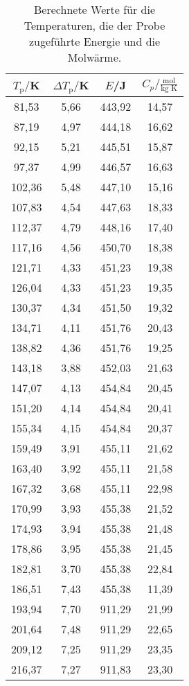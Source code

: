 \begin{table}[htp]
	\begin{center}
    \caption{Berechnete Werte für die Temperaturen, die der Probe zugeführte Energie und die
    Molwärme.}
    \label{tab:cp}
		\begin{tabular}{cccc}
		\toprule
			{$T_\text{p}/$K} & {$\Delta T_\text{p}/$K} & {$E$/J} & {$C_p/\frac{\text{mol}}{\text{kg K}}$}\\
			\midrule
			81,53 & 5,66 & 443,92 & 14,57\\
			87,19 & 4,97 & 444,18 & 16,62\\
			92,15 & 5,21 & 445,51 & 15,87\\
			97,37 & 4,99 & 446,57 & 16,63\\
			102,36 & 5,48 & 447,10 & 15,16\\
			107,83 & 4,54 & 447,63 & 18,33\\
			112,37 & 4,79 & 448,16 & 17,40\\
			117,16 & 4,56 & 450,70 & 18,38\\
			121,71 & 4,33 & 451,23 & 19,38\\
			126,04 & 4,33 & 451,23 & 19,35\\
			130,37 & 4,34 & 451,50 & 19,32\\
			134,71 & 4,11 & 451,76 & 20,43\\
			138,82 & 4,36 & 451,76 & 19,25\\
			143,18 & 3,88 & 452,03 & 21,63\\
			147,07 & 4,13 & 454,84 & 20,45\\
			151,20 & 4,14 & 454,84 & 20,41\\
			155,34 & 4,15 & 454,84 & 20,37\\
			159,49 & 3,91 & 455,11 & 21,62\\
			163,40 & 3,92 & 455,11 & 21,58\\
			167,32 & 3,68 & 455,11 & 22,98\\
			170,99 & 3,93 & 455,38 & 21,52\\
			174,93 & 3,94 & 455,38 & 21,48\\
			178,86 & 3,95 & 455,38 & 21,45\\
			182,81 & 3,70 & 455,38 & 22,84\\
			186,51 & 7,43 & 455,38 & 11,39\\
			193,94 & 7,70 & 911,29 & 21,99\\
			201,64 & 7,48 & 911,29 & 22,65\\
			209,12 & 7,25 & 911,29 & 23,35\\
			216,37 & 7,27 & 911,83 & 23,30\\

\end{tabular}
\end{center}
\end{table}
